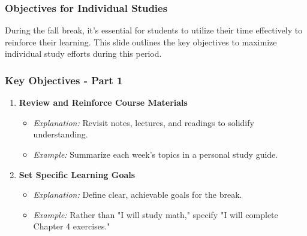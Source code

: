 \documentclass[aspectratio=169]{beamer}
\begin{document}
\begin{frame}[fragile]
    \frametitle{Objectives for Individual Studies}
    
    During the fall break, it's essential for students to utilize their time effectively to reinforce their learning. This slide outlines the key objectives to maximize individual study efforts during this period.
\end{frame}

\begin{frame}[fragile]
    \frametitle{Key Objectives - Part 1}
    
    \begin{enumerate}
        \item \textbf{Review and Reinforce Course Materials}
        \begin{itemize}
            \item \textit{Explanation:} Revisit notes, lectures, and readings to solidify understanding.
            \item \textit{Example:} Summarize each week’s topics in a personal study guide.
        \end{itemize}
        
        \item \textbf{Set Specific Learning Goals}
        \begin{itemize}
            \item \textit{Explanation:} Define clear, achievable goals for the break.
            \item \textit{Example:} Rather than "I will study math," specify "I will complete Chapter 4 exercises."
        \end{itemize}
    \end{enumerate}
\end{frame}
\end{document}
